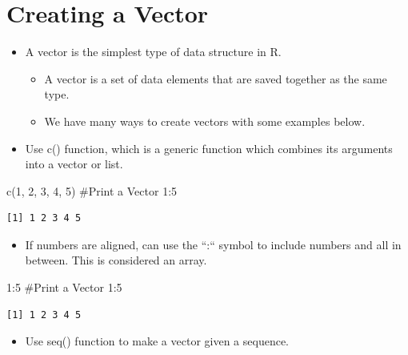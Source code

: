 \documentclass[
  letterpaper,
  DIV=11,
  numbers=noendperiod]{scrreprt}
\newenvironment{Shaded}{\begin{snugshade}}{\end{snugshade}}
\newcommand{\CommentTok}[1]{\textcolor[rgb]{0.37,0.37,0.37}{#1}}
\newcommand{\DecValTok}[1]{\textcolor[rgb]{0.68,0.00,0.00}{#1}}
\newcommand{\FunctionTok}[1]{\textcolor[rgb]{0.28,0.35,0.67}{#1}}
\newcommand{\NormalTok}[1]{\textcolor[rgb]{0.00,0.23,0.31}{#1}}
\newcommand{\SpecialCharTok}[1]{\textcolor[rgb]{0.37,0.37,0.37}{#1}}
\providecommand{\tightlist}{%
  \setlength{\itemsep}{0pt}\setlength{\parskip}{0pt}}\usepackage{longtable,booktabs,array}
\begin{document}
\section{Creating a Vector}\label{creating-a-vector}

\begin{itemize}
\tightlist
\item
  A vector is the simplest type of data structure in R.

  \begin{itemize}
  \tightlist
  \item
    A vector is a set of data elements that are saved together as the
    same type.
  \item
    We have many ways to create vectors with some examples below.
  \end{itemize}
\item
  Use c() function, which is a generic function which combines its
  arguments into a vector or list.
\end{itemize}

\begin{Shaded}
\begin{Highlighting}[]
\FunctionTok{c}\NormalTok{(}\DecValTok{1}\NormalTok{, }\DecValTok{2}\NormalTok{, }\DecValTok{3}\NormalTok{, }\DecValTok{4}\NormalTok{, }\DecValTok{5}\NormalTok{)  }\CommentTok{\#Print a Vector 1:5}
\end{Highlighting}
\end{Shaded}

\begin{verbatim}
[1] 1 2 3 4 5
\end{verbatim}

\begin{itemize}
\tightlist
\item
  If numbers are aligned, can use the ``:`` symbol to include numbers
  and all in between. This is considered an array.
\end{itemize}

\begin{Shaded}
\begin{Highlighting}[]
\DecValTok{1}\SpecialCharTok{:}\DecValTok{5}  \CommentTok{\#Print a Vector 1:5}
\end{Highlighting}
\end{Shaded}

\begin{verbatim}
[1] 1 2 3 4 5
\end{verbatim}

\begin{itemize}
\tightlist
\item
  Use seq() function to make a vector given a sequence.
\end{itemize}
\end{document}
